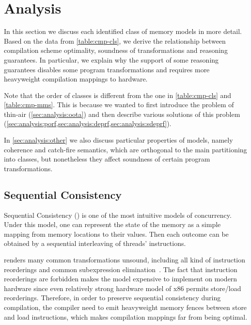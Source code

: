 \section{Analysis}
\label{sec:analysis}


In this section we discuss each identified class of memory models in more detail.
Based on the data from \cref{table:cmp-cls},
we derive the relationship between compilation scheme optimality, 
soundness of transformations and reasoning guarantees.
In particular, we explain why the support of some reasoning guarantees 
disables some program transformations and requires more heavyweight 
compilation mappings to hardware.

Note that the order of classes is different from the one 
in \cref{table:cmp-cls} and \cref{table:cmp-mms}.
This is because we wanted to first introduce the problem 
of thin-air (\cref{sec:analysis:oota}) and then describe 
various solutions of this problem
(\cref{sec:analysis:porf,sec:analysis:deprf,sec:analysis:sdeprf}).

In \cref{sec:analysis:other} we also discuss particular properties 
of models, namely coherence and catch-fire semantics, 
which are orthogonal to the main partitioning into classes, 
but nonetheless they affect soundness of certain program transformations.



\subsection{Sequential Consistency}
\label{sec:analysis:seqcst}

Sequential Consistency (\SC) is one of the most intuitive models of concurrency.
Under this model, one can represent the state of the memory as 
a simple mapping from memory locations to their values. 
Then each outcome can be obtained by a sequential interleaving
of threads' instructions. 

\SC renders many common transformations unsound, 
including all kind of instruction reorderings and 
common subexpression elimination~\cite{Marino-al:PLDI11, Sevcik-Aspinall:ECOOP08}.
The fact that instruction reorderings are forbidden 
makes the model expensive to implement on modern hardware
since even relatively strong hardware model of x86
permits store/load reorderings.
Therefore, in order to preserve sequential consistency during compilation,
the compiler need to emit heavyweight memory fences between store and load instructions,
which makes compilation mappings far from being optimal.  

